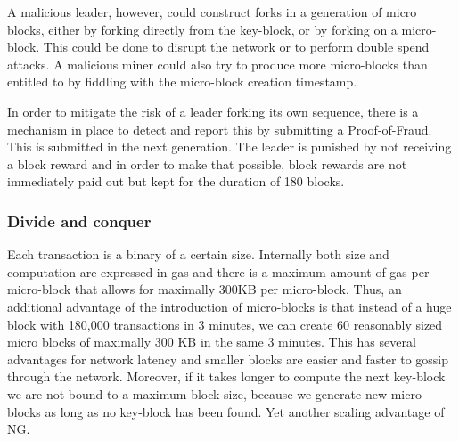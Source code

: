 A malicious leader, however, could construct forks in a generation of micro
blocks, either by forking directly from the key-block, or by forking
on a micro-block. This could be done to disrupt the network or to
perform double spend attacks. A malicious miner could also try to
produce more micro-blocks than entitled to by fiddling with the
micro-block creation timestamp.

In order to mitigate the risk of a leader forking its own sequence,
there is a mechanism in place to detect and report this by submitting
a Proof-of-Fraud. This is submitted in the next
generation. The leader is punished by not receiving a block reward and
in order to make that possible, block rewards are not immediately paid out but kept for
the duration of 180 blocks.

\subsubsection{Divide and conquer}

Each transaction is a binary of a certain size. Internally both size
and computation are expressed in gas and there is a maximum amount of
gas per micro-block that allows for maximally 300KB per micro-block.
Thus, an additional advantage of the introduction of micro-blocks is that
instead of a huge block with 180,000 transactions in 3 minutes, we can create 60
reasonably sized micro blocks of maximally 300 KB  in the same 3
minutes. This has several advantages for network latency and
smaller blocks are easier and faster to gossip through the
network. Moreover, if it takes longer to compute the next key-block we
are not bound to a maximum block size, because we generate new
micro-blocks as long as no key-block has been found. Yet another
scaling advantage of NG.
